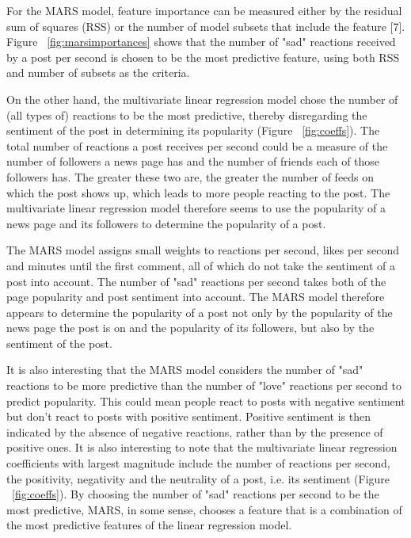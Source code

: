 \documentclass[twoside]{article}
\begin{document}
\begin{multicols}{2}
For the MARS model, feature importance can be measured either by the residual sum of squares (RSS) or the number of model subsets that include the feature [7]. Figure ~\ref{fig:marsimportances} shows that the number of "sad" reactions received by a post per second is chosen to be the most predictive feature, using both RSS and number of subsets as the criteria. 

On the other hand, the multivariate linear regression model chose the number of (all types of) reactions to be the most predictive, thereby disregarding the sentiment of the post in determining its popularity (Figure ~\ref{fig:coeffs}). The total number of reactions a post receives per second could be a measure of the number of followers a news page has and the number of friends each of those followers has. The greater these two are, the greater the number of feeds on which the post shows up, which leads to more people reacting to the post. The multivariate linear regression model therefore seems to use the popularity of a news page and its followers to determine the popularity of a post. 

The MARS model assigns small weights to reactions per second, likes per second and minutes until the first comment, all of which do not take the sentiment of a post into account.  The number of "sad" reactions per second takes both of the page popularity and post sentiment into account. The MARS model therefore appears to determine the popularity of a post not only by the popularity of the news page the post is on and the popularity of its followers, but also by the sentiment of the post. 

It is also interesting that the MARS model considers the number of "sad" reactions to be more predictive than the number of "love" reactions per second to predict popularity. This could mean people react to posts with negative sentiment but don't react to posts with positive sentiment. Positive sentiment is then indicated by the absence of negative reactions, rather than by the presence of positive ones. It is also interesting to note that the multivariate linear regression coefficients with largest magnitude include the number of reactions per second, the positivity, negativity and the neutrality of a post, i.e. its sentiment (Figure ~\ref{fig:coeffs}). By choosing the number of "sad" reactions per second to be the most predictive, MARS, in some sense, chooses a feature that is a combination of the most predictive features of the linear regression model.

\end{multicols}
\end{document}
